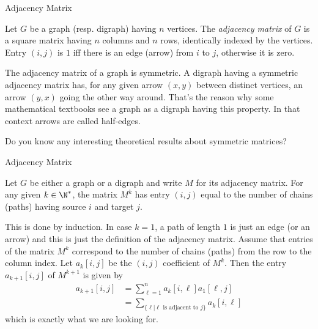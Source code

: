 \documentclass[32pt,aspectratio=169]{beamer}
\begin{document}
\begin{frame}{Adjacency Matrix}
  \begin{defn}
    Let $G$ be a graph (resp. digraph) having $n$ vertices. The
    \emph{adjacency matrix} of $G$ is a square matrix having $n$
    columns and $n$ rows, identically indexed by the vertices. Entry
    $(i, j)$ is $1$ iff there is an edge (arrow) from $i$ to $j$,
    otherwise it is zero.
  \end{defn}
  \pause
  \begin{rem}
    The adjacency matrix of a graph is symmetric. A digraph having a
    symmetric adjacency matrix has, for any given arrow $(x, y)$
    between distinct vertices, an arrow $(y, x)$ going the other way
    around. \pause That's the reason why some mathematical textbooks see a
    graph as a digraph having this property. In that context arrows
    are called half-edges.
  \end{rem}
  \pause
  \begin{question}
    Do you know any interesting theoretical results about symmetric
    matrices?
  \end{question}
\end{frame}

\begin{frame}{Adjacency Matrix}
  \begin{prop}
    Let $G$ be either a graph or a digraph and write $M$ for its
    adjacency matrix. For any given $k \in \N^*$, the matrix $M^k$ has
    entry $(i, j)$ equal to the number of chains (paths) having source
    $i$ and target $j$.
  \end{prop}
  \pause
  \setlength\columnseprule{.1pt}
  \begin{multicols}{2}
    \begin{demo}
      This is done by induction. In case $k = 1$, a path of length $1$
      is just an edge (or an arrow) and this is just the definition of
      the adjacency matrix. \pause Assume that entries of the matrix
      $M^k$ correspond to the number of chains (paths) from the row to
      the column index. Let $a_k[i, j]$ be the $(i, j)$ coefficient of
      $M^k$. Then the entry $a_{k+1}[i, j]$ of $M^{k+1}$ is given by
      \begin{align*}
        a_{k+1}[i, j] &= \sum_{\ell = 1}^n a_k[i, \ell]a_1[\ell, j]\\
                      & = \sum_{\big\{\ell \big| \textrm{$\ell$ is adjacent to $j$}\big\}} a_k[i, \ell]
      \end{align*}
      which is exactly what we are looking for.
    \end{demo}
  \end{multicols}
\end{frame}
\end{document}
